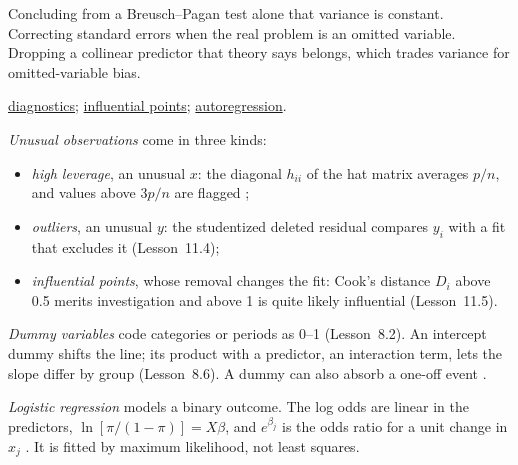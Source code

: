 \begin{qfmethod}
 Concluding from a Breusch--Pagan test alone that variance is constant. Correcting standard errors when the real problem is an omitted variable. Dropping a collinear predictor that theory says belongs, which trades variance for omitted-variable bias.

 \hyperref[meth:regression-diagnostics-anova]{diagnostics}; \hyperref[meth:regression-extensions]{influential points}; \hyperref[meth:autoregressive-forecasting]{autoregression}.

\end{qfmethod}

\begin{qfmethod}\label{meth:regression-extensions}
 \emph{Unusual observations} come in three kinds:
\begin{itemize}
\item \emph{high leverage}, an unusual $x$: the diagonal $h_{ii}$ of the hat matrix averages $p/n$, and values above $3p/n$ are flagged \citep[Lesson~11.2]{regression-methods-course-notes};
\item \emph{outliers}, an unusual $y$: the studentized deleted residual compares $y_i$ with a fit that excludes it (Lesson~11.4);
\item \emph{influential points}, whose removal changes the fit: Cook's distance $D_i$ above 0.5 merits investigation and above 1 is quite likely influential (Lesson~11.5).
\end{itemize}

\emph{Dummy variables} code categories or periods as 0--1 (Lesson~8.2). An intercept dummy shifts the line; its product with a predictor, an interaction term, lets the slope differ by group (Lesson~8.6). A dummy can also absorb a one-off event \citep[sec.~7.4]{s7-hyndman}.

\emph{Logistic regression} models a binary outcome. The log odds are linear in the predictors, $\ln[\pi/(1-\pi)]=X\beta$, and $e^{\beta_j}$ is the odds ratio for a unit change in $x_j$ \citep[Lesson~13.2]{regression-methods-course-notes}. It is fitted by maximum likelihood, not least squares.


\end{qfmethod}
